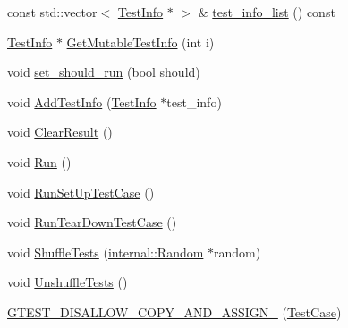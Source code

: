 \begin{DoxyCompactItemize}
const std\-::vector$<$ \hyperlink{classtesting_1_1TestInfo}{\-Test\-Info} $\ast$ $>$ \& \hyperlink{classtesting_1_1TestCase_af56750ff9e6c7865f20ae51cfc8d793e}{test\-\_\-info\-\_\-list} () const 
\item 
\hyperlink{classtesting_1_1TestInfo}{\-Test\-Info} $\ast$ \hyperlink{classtesting_1_1TestCase_af8ef3f6fc704ca1dc6723ce078c9ee6e}{\-Get\-Mutable\-Test\-Info} (int i)
\item 
void \hyperlink{classtesting_1_1TestCase_ab3f3dbe8ef52473f912aef44d04193d5}{set\-\_\-should\-\_\-run} (bool should)
\item 
void \hyperlink{classtesting_1_1TestCase_a2a0417de1ee92080aae4676c77318b01}{\-Add\-Test\-Info} (\hyperlink{classtesting_1_1TestInfo}{\-Test\-Info} $\ast$test\-\_\-info)
\item 
void \hyperlink{classtesting_1_1TestCase_a566dca6156477ed747aa781f341d13d5}{\-Clear\-Result} ()
\item 
void \hyperlink{classtesting_1_1TestCase_aa3eca255b6be227d7d901cc2a72017a5}{\-Run} ()
\item 
void \hyperlink{classtesting_1_1TestCase_a0a9185d58f27f485506f4c0dedaab124}{\-Run\-Set\-Up\-Test\-Case} ()
\item 
void \hyperlink{classtesting_1_1TestCase_a68c2b3492b96c37271344d40a79caa84}{\-Run\-Tear\-Down\-Test\-Case} ()
\item 
void \hyperlink{classtesting_1_1TestCase_a0005a140538304e16d0bbd0bf08b3b65}{\-Shuffle\-Tests} (\hyperlink{classtesting_1_1internal_1_1Random}{internal\-::\-Random} $\ast$random)
\item 
void \hyperlink{classtesting_1_1TestCase_ae4c0afbfb6a7d13aece4c3a256a5d01d}{\-Unshuffle\-Tests} ()
\item 
\hyperlink{classtesting_1_1TestCase_a589179a7edfbdc3809f75a5bd7090dee}{\-G\-T\-E\-S\-T\-\_\-\-D\-I\-S\-A\-L\-L\-O\-W\-\_\-\-C\-O\-P\-Y\-\_\-\-A\-N\-D\-\_\-\-A\-S\-S\-I\-G\-N\-\_\-} (\hyperlink{classtesting_1_1TestCase}{\-Test\-Case})
\end{DoxyCompactItemize}
